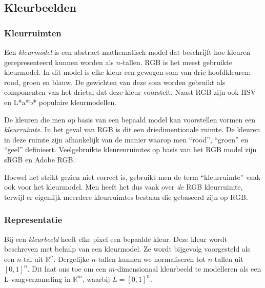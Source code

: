 \subsection{Kleurbeelden}

\subsubsection{Kleurruimten}

Een \emph{kleurmodel} is een abstract mathematisch model dat beschrijft hoe kleuren gerepresenteerd 
kunnen worden als $n$-tallen. RGB is het meest gebruikte kleurmodel. In dit model is elke kleur
een gewogen som van drie hoofdkleuren: rood, groen en blauw. De gewichten van deze som
worden gebruikt als componenten van het drietal dat deze kleur voorstelt. Naast RGB zijn ook
HSV en L*a*b* populaire kleurmodellen.

De kleuren die men op basis van een bepaald model kan voorstellen vormen een \emph{kleurruimte}. 
In het geval van RGB is dit een driedimentionale ruimte. De kleuren in deze ruimte zijn afhankelijk
van de manier waarop men ``rood'', ``groen'' en ``geel'' definieert. Veelgebruikte kleurenruimtes 
op basis van het RGB model zijn sRGB en Adobe RGB.

Hoewel het strikt gezien niet correct is, gebruikt men de term ``kleurruimte'' vaak ook voor het
kleurmodel. Men heeft het dus vaak over \emph{de} RGB kleurruimte, terwijl er eigenlijk meerdere
kleurruimtes bestaan die gebaseerd zijn op RGB. 

\subsubsection{Representatie}

Bij een \emph{kleurbeeld} heeft elke pixel een bepaalde kleur. Deze kleur wordt beschreven met
behulp van een kleurmodel. Ze wordt bijgevolg voorgesteld als een $n$-tal uit
$\mathbb{R}^n$. Dergelijke $n$-tallen kunnen we normaliseren tot $n$-tallen uit $[0,1]^n$. 
Dit laat ons toe om een $m$-dimensionaal kleurbeeld te modelleren als een L-vaagverzameling in 
$\mathbb{R}^m$, waarbij $L=[0,1]^n$.

